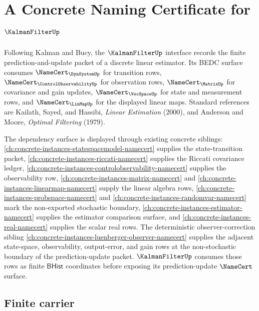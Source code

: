 \chapter{A Concrete Naming Certificate for $\KalmanFilterUp$}
\label{ch:concrete-instances-kalman-filter-namecert}

Following Kalman and Bucy, the $\KalmanFilterUp$ interface records the finite prediction-and-update packet of a discrete linear estimator. Its BEDC surface consumes $\NameCert_{\DynSystemUp}$ for transition rows, $\NameCert_{\ControlObservabilityUp}$ for observation rows, $\NameCert_{\MatrixUp}$ for covariance and gain updates, $\NameCert_{\VecSpaceUp}$ for state and measurement rows, and $\NameCert_{\LinMapUp}$ for the displayed linear maps. Standard references are Kailath, Sayed, and Hassibi, \emph{Linear Estimation} (2000), and Anderson and Moore, \emph{Optimal Filtering} (1979).

The dependency surface is displayed through existing concrete siblings: \autoref{ch:concrete-instances-statespacemodel-namecert} supplies the state-transition packet, \autoref{ch:concrete-instances-riccati-namecert} supplies the Riccati covariance ledger, \autoref{ch:concrete-instances-controlobservability-namecert} supplies the observability row, \autoref{ch:concrete-instances-matrix-namecert} and \autoref{ch:concrete-instances-linearmap-namecert} supply the linear algebra rows, \autoref{ch:concrete-instances-probspace-namecert} and \autoref{ch:concrete-instances-randomvar-namecert} mark the non-exported stochastic boundary, \autoref{ch:concrete-instances-estimator-namecert} supplies the estimator comparison surface, and \autoref{ch:concrete-instances-real-namecert} supplies the scalar real rows. The deterministic observer-correction sibling \autoref{ch:concrete-instances-luenberger-observer-namecert} supplies the adjacent state-space, observability, output-error, and gain rows at the non-stochastic boundary of the prediction-update packet. $\KalmanFilterUp$ consumes those rows as finite $\mathsf{BHist}$ coordinates before exposing its prediction-update $\NameCert$ surface.

\section{Finite carrier}
\label{sec:kalmanfilter-carrier}

